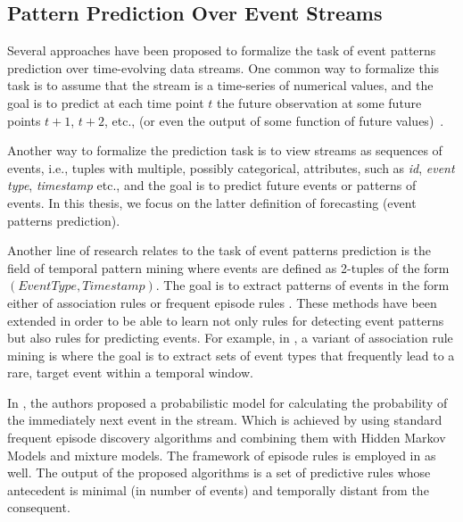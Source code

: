 

\subsection{Pattern Prediction Over Event Streams}

\par Several approaches have been proposed to formalize the task of event patterns prediction over time-evolving data streams.  One common way to formalize this task is to assume that the stream is a time-series of numerical values, and the goal is to predict at each time point $t$ the future observation at some future points $t+1$, $t+2$, etc., (or even the output of some function of future values)~\cite{montgomery_introduction_2015}. 



Another way to formalize the prediction task is to view streams as sequences of events,
i.e., tuples with multiple, possibly categorical, attributes, such as \textit{id}, \textit{event type}, \textit{timestamp} etc., and the goal is to predict future events or  patterns of events. In this thesis, we focus on the latter definition of forecasting (event patterns prediction).  

\par Another line of research relates to the task of event patterns prediction is the field of temporal pattern mining where events are defined as 2-tuples of the form \((\mathit{EventType}, \mathit{Timestamp})\). The goal is to extract patterns of events in the form either of association rules \cite{agrawal_mining_1993} or frequent episode rules \cite{mannila_discovery_1997}. These methods have been extended in order to be able to learn not only rules for detecting event patterns but also rules for predicting events. For example, in \cite{vilalta_predicting_2002}, a variant of association rule mining is where the goal is to extract sets of event types that frequently lead to a rare, target event within a temporal window. 

\par In \citet{laxman_stream_2008}, the authors proposed a probabilistic model
for calculating the probability of the immediately next event in the stream. Which is achieved by using standard frequent episode discovery algorithms and combining them with Hidden Markov Models and mixture models. The framework of episode rules is employed in \cite{fahed_efficient_2014} as well. The output of the proposed algorithms is a set of predictive rules whose antecedent is minimal (in number of events) and temporally distant from the consequent.

